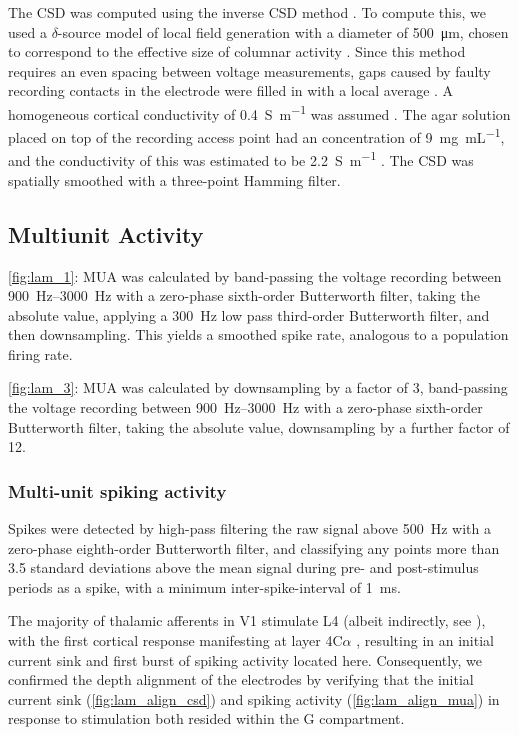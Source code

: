 The \ac{CSD} was computed using the inverse \ac{CSD} method \citep{Pettersen2006}.
To compute this, we used a $\delta$-source model of local field generation with a diameter of \SI{500}{\micro\metre}, chosen to correspond to the effective size of columnar activity \citep{Horton2005,Lund2003}.
Since this method requires an even spacing between voltage measurements, gaps caused by faulty recording contacts in the electrode were filled in with a local average \citep{Wojcik2010}.
A homogeneous cortical conductivity of \SI{0.4}{\siemens\per\metre} was assumed \citep{Logothetis2007}.
The agar solution placed on top of the recording access point had an  concentration of \SI{9}{\mg\per\mL}, and the conductivity of this was estimated to be \SI{2.2}{\siemens\per\metre} \citep{Kandadai2012}.
The \ac{CSD} was spatially smoothed with a three-point Hamming filter.


\subsection{Multiunit Activity}

\autoref{fig:lam_1}: \ac{MUA} was calculated by band-passing the voltage recording between \SIrange{900}{3000}{Hz} with a zero-phase sixth-order Butterworth filter, taking the absolute value, applying a \SI{300}{Hz} low pass third-order Butterworth filter, and then downsampling.
This yields a smoothed spike rate, analogous to a population firing rate.

\autoref{fig:lam_3}: \ac{MUA} was calculated by downsampling by a factor of \num{3}, band-passing the voltage recording between \SIrange{900}{3000}{Hz} with a zero-phase sixth-order Butterworth filter, taking the absolute value, downsampling by a further factor of \num{12}.

\subsubsection{Multi-unit spiking activity}

Spikes were detected by high-pass filtering the raw signal above \SI{500}{Hz} with a zero-phase eighth-order Butterworth filter, and classifying any points more than 3.5 standard deviations above the mean signal during pre- and post-stimulus periods as a spike, with a minimum inter-spike-interval of \SI{1}{\milli\second}.

The majority of thalamic afferents in \ac{V1} stimulate \ac{L4} (albeit indirectly, see \citealp{Hansen2012}), with the first cortical response manifesting at layer 4C$\alpha$ \citep{Callaway1998}, resulting in an initial current sink and first burst of spiking activity located here.
Consequently, we confirmed the depth alignment of the electrodes by verifying that the initial current sink (\autoref{fig:lam_align_csd}) and spiking activity (\autoref{fig:lam_align_mua}) in response to stimulation both resided within the \ac{G} compartment.


